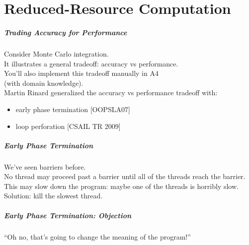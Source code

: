 \part{Reduced-Resource Computation}
\frame{\partpage}

\begin{frame}
  \frametitle{Trading Accuracy for Performance}


    Consider Monte Carlo integration.\\
    It illustrates a general tradeoff: accuracy vs performance.\\
    You'll also implement this tradeoff manually in A4 \\ \qquad (with domain knowledge).\\[1em]

    Martin Rinard generalized the accuracy vs performance tradeoff with:
      \begin{itemize}
        \item early phase termination [OOPSLA07]
        \item loop perforation [CSAIL TR 2009]
      \end{itemize}

\end{frame}


\begin{frame}
  \frametitle{Early Phase Termination}



  We've seen barriers before.\\

  No thread may proceed past a barrier until all of the threads
reach the barrier.\\[1em]

  This may slow down the program: maybe one of the threads is horribly
  slow.\\[1em]

  Solution: kill the slowest thread.


\end{frame}

\begin{frame}
  \frametitle{Early Phase Termination: Objection}

\Huge
\begin{center}
``Oh no, that's going to change the meaning of the program!''
\end{center}
\end{frame}

